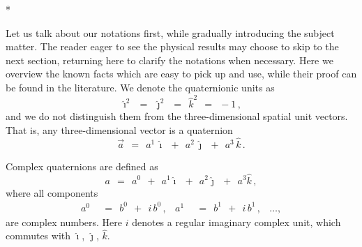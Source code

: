 \documentclass[epsfig,12pt]{article}
\newcommand{\ii}{\hat\imath}
\newcommand{\jj}{\hat\jmath}
\newcommand{\kk}{\hat k}
\begin{document}
\vskip 0.8cm
\centerline{*\qquad\qquad\qquad*\qquad\qquad\qquad*}
\vskip 0.6cm


	Let us talk about our notations first, while gradually introducing the subject matter.
	The reader eager to see the physical results may choose to skip to the next section, returning here
	to clarify the notations when necessary.
	Here we overview the known facts which are easy to pick up and use, while their proof can be found in the literature.
	We denote the quaternionic units as
\begin{equation}
	\ii^2	~~=~~	\jj^2	~~=~~	\kk^2	~~=~~	-1\,,
\end{equation}
	and we do not distinguish them from the three-dimensional spatial unit vectors.
	That is, any three-dimensional vector is a quaternion
\begin{equation}
	\vec a	~~=~~	a^1\, \ii  ~~+~~  a^2\, \jj  ~~+~~  a^3\, \kk\,.
\end{equation}

	Complex quaternions are defined as
\begin{equation}
\label{cq}
	a	~~=~~	a^0  ~~+~~  a^1 \ii  ~~+~~  a^2 \jj  ~~+~~  a^3 \kk\,,
\end{equation}
	where all components
\begin{align}
	a^0	& ~~=~~	b^0  ~~+~~  i\,b^0\,,
	&
	a^1	& ~~=~~ b^1  ~~+~~  i\,b^1\,,
	&
	\dots,
\end{align}
	are complex numbers.
	Here $ i $ denotes a regular imaginary complex unit, which commutes with $ \ii $, $ \jj $, $ \kk $.
\end{document}
